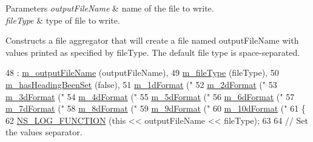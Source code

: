\begin{DoxyParams}{Parameters}
{\em output\+File\+Name} & name of the file to write. \\
\hline
{\em file\+Type} & type of file to write.\\
\hline
\end{DoxyParams}
Constructs a file aggregator that will create a file named output\+File\+Name with values printed as specified by file\+Type. The default file type is space-\/separated. 
\begin{DoxyCode}
48   : \hyperlink{classns3_1_1FileAggregator_ad3840bfc503a61e0020746fdc88d7be3}{m\_outputFileName}    (outputFileName),
49     \hyperlink{classns3_1_1FileAggregator_aa2a8abfe3082a802dc6705e701f73e9e}{m\_fileType}          (fileType),
50     \hyperlink{classns3_1_1FileAggregator_a994026e8bd889b7db66789be359f8f42}{m\_hasHeadingBeenSet} (\textcolor{keyword}{false}),
51     \hyperlink{classns3_1_1FileAggregator_ac0d6eb5be1e146ebba86897303191c88}{m\_1dFormat}          (\textcolor{stringliteral}{"%
52     \hyperlink{classns3_1_1FileAggregator_af26ec05f2349691c0d436d8e15de1831}{m\_2dFormat}          (\textcolor{stringliteral}{"%
53     \hyperlink{classns3_1_1FileAggregator_ab86ae12895719cfb867e102706858cec}{m\_3dFormat}          (\textcolor{stringliteral}{"%
54     \hyperlink{classns3_1_1FileAggregator_a388f2825222368149d5b0abf1bc6b781}{m\_4dFormat}          (\textcolor{stringliteral}{"%
55     \hyperlink{classns3_1_1FileAggregator_a247f50a47e562ed81cb794e4615796f7}{m\_5dFormat}          (\textcolor{stringliteral}{"%
56     \hyperlink{classns3_1_1FileAggregator_ad3cbb0a4fc2b0ec4499bcae467f3a2b8}{m\_6dFormat}          (\textcolor{stringliteral}{"%
57     \hyperlink{classns3_1_1FileAggregator_a99d97fdbd128467b17b8b737c64ad50a}{m\_7dFormat}          (\textcolor{stringliteral}{"%
58     \hyperlink{classns3_1_1FileAggregator_adb1cc33d1eff8d031a3debddba92b9a5}{m\_8dFormat}          (\textcolor{stringliteral}{"%
59     \hyperlink{classns3_1_1FileAggregator_a8726cd1f40f4da37cdd544873b4ea583}{m\_9dFormat}          (\textcolor{stringliteral}{"%
60     \hyperlink{classns3_1_1FileAggregator_a737006d5ab018c7f7d3b00bf85040015}{m\_10dFormat}         (\textcolor{stringliteral}{"%
61 \{
62   \hyperlink{log-macros-disabled_8h_a90b90d5bad1f39cb1b64923ea94c0761}{NS\_LOG\_FUNCTION} (\textcolor{keyword}{this} << outputFileName << fileType);
63 
64   \textcolor{comment}{// Set the values separator.}
}}}}}}}}}}
\end{DoxyCode}
